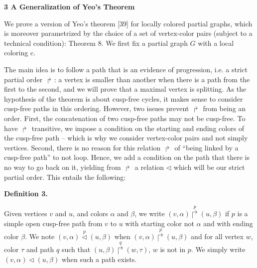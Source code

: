 \documentclass[10pt,a4paper]{amsart}
\begin{document}
   
 
 


 
\par\medskip\noindent\textbf{3 A Generalization of Yeo’s Theorem}\par
 
 
We prove a version of Yeo’s theorem [39] for locally colored partial graphs, which is moreover parametrized by the choice of a set of vertex-color pairs (subject to a technical condition): Theorem 8. We first fix a partial graph $G$ with a local coloring c.\par
 
 
 
The main idea is to follow a path that is an evidence of progression, i.e. a strict partial order $\Rsh$: a vertex is smaller than another when there is a path from the first to the second, and we will prove that a maximal vertex is splitting. As the hypothesis of the theorem is about cusp-free cycles, it makes sense to consider cusp-free paths in this ordering. However, two issues prevent $\Rsh$ from being an order. First, the concatenation of two cusp-free paths may not be cusp-free. To have $\Rsh$ transitive, we impose a condition on the starting and ending colors of the cusp-free path – which is why we consider vertex-color pairs and not simply vertices. Second, there is no reason for this relation $\Rsh$ of “being linked by a cusp-free path” to not loop. Hence, we add a condition on the path that there is no way to go back on it, yielding from $\Rsh$ a relation $\lhd$ which will be our strict partial order. This entails the following:\par
 
 
 
\par\medskip\noindent\textbf{Definition 3.}\par
 
 
Given vertices $v$ and $u$, and colors $\alpha$ and $\beta$, we write $(v,\alpha)\overset{p}{\Rsh}(u,\beta)$ if $p$ is a simple open cusp-free path from $v$ to $u$ with starting color not $\alpha$ and with ending color $\beta$. We note $(v,\alpha)\overset{p}{\lhd}(u,\beta)$ when $(v,\alpha)\overset{p}{\Rsh}(u,\beta)$ and for all vertex $w$, color $\tau$ and path $q$ such that $(u,\beta)\overset{q}{\Rsh}(w,\tau)$, $w$ is not in $p$. We simply write $(v,\alpha)\lhd(u,\beta)$ when such a path exists.\par
 
\end{document}
